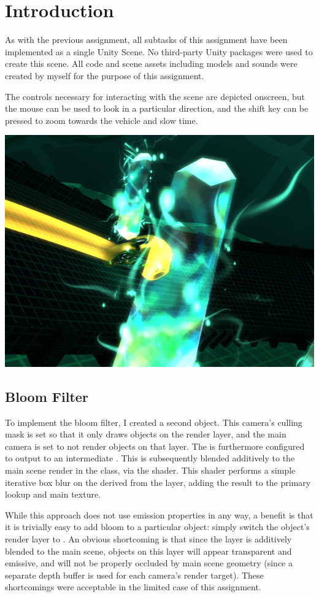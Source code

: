 \documentclass[12pt]{article}
\begin{document}
\maketitle

\section*{Introduction}
As with the previous assignment, all subtasks of this assignment have been implemented as a single Unity Scene. No third-party Unity packages were used to create this scene. All code and scene assets including models and sounds were created by myself for the purpose of this assignment.

The controls necessary for interacting with the scene are depicted onscreen, but the mouse can be used to look in a particular direction, and the shift key can be pressed to zoom towards the vehicle and slow time.

\begin{center}
	\includegraphics[width=0.5\linewidth]{part1.png}
\end{center}
\subsection*{Bloom Filter}
To implement the bloom filter, I created a second  object. This camera's culling mask is set so that it only draws objects on the  render layer, and the main camera is set to not render objects on that layer. The  is furthermore configured to output to an intermediate . This  is subsequently blended additively to the main scene render in the  class, via the  shader. This shader performs a simple iterative box blur on the  derived from the  layer, adding the result to the primary lookup and main texture.

While this approach does not use emission properties in any way, a benefit is that it is trivially easy to add bloom to a particular object: simply switch the object's render layer to . An obvious shortcoming is that since the  layer is additively blended to the main scene, objects on this layer will appear transparent and emissive, and will not be properly occluded by main scene geometry (since a separate depth buffer is used for each camera's render target). These shortcomings were acceptable in the limited case of this assignment.
\end{document}
